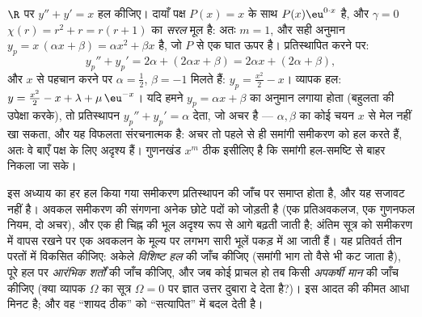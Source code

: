 \begin{example}[बहुलता का नियम काम पर]\label{ex:b1:diffeq:multiplicity}
$\R$ पर $y'' + y' = x$ हल कीजिए। दायाँ पक्ष $P(x) = x$ के साथ $P(x)\eu^{0
\cdot x}$ है, और $\gamma = 0$ $\chi(r) = r^2 + r = r(r + 1)$ का \emph{सरल}
मूल है: अतः $m = 1$, और सही अनुमान $y_p = x\,(\alpha x + \beta) = \alpha x^2
+ \beta x$ है, जो $P$ से एक घात ऊपर है। प्रतिस्थापित करने पर:
\[
y_p'' + y_p' = 2\alpha + (2\alpha x + \beta)
= 2\alpha x + (2\alpha + \beta) ,
\]
और $x$ से पहचान करने पर $\alpha = \frac12$, $\beta = -1$ मिलते हैं: $y_p =
\frac{x^2}2 - x$। व्यापक हल: $y = \frac{x^2}2 - x + \lambda +
\mu\,\eu^{-x}$। यदि हमने $y_p = \alpha x + \beta$ का अनुमान लगाया होता
(बहुलता की उपेक्षा करके), तो प्रतिस्थापन $y_p'' + y_p' = \alpha$ देता, जो
अचर है --- $\alpha, \beta$ का कोई चयन $x$ से मेल नहीं खा सकता, और यह विफलता
संरचनात्मक है: अचर तो पहले से ही समांगी समीकरण को हल करते हैं, अतः वे बाएँ
पक्ष के लिए अदृश्य हैं। गुणनखंड $x^m$ ठीक इसीलिए है कि समांगी हल-समष्टि से
बाहर निकला जा सके।
\end{example}

\begin{remark}[तीस सेकंड की बीमा-पॉलिसी]\label{rem:b1:diffeq:check}
इस अध्याय का हर हल किया गया समीकरण प्रतिस्थापन की जाँच पर समाप्त होता है, और
यह सजावट नहीं है। अवकल समीकरण की संगणना अनेक छोटे पदों को जोड़ती है (एक
प्रतिअवकलज, एक गुणनफल नियम, दो अचर), और एक ही चिह्न की भूल अदृश्य रूप से आगे
बढ़ती जाती है; अंतिम सूत्र को समीकरण में वापस रखने पर एक अवकलन के मूल्य पर
लगभग सारी भूलें पकड़ में आ जाती हैं। यह प्रतिवर्त तीन परतों में विकसित
कीजिए: अकेले \emph{विशिष्ट हल} की जाँच कीजिए (समांगी भाग तो वैसे भी कट जाता
है), पूरे हल पर \emph{आरंभिक शर्तों} की जाँच कीजिए, और जब कोई प्राचल हो तब
किसी \emph{अपकर्षी मान} की जाँच कीजिए (क्या व्यापक $\Omega$ का सूत्र $\Omega
= 0$ पर ज्ञात उत्तर दुबारा दे देता है?)। इस आदत की कीमत आधा मिनट है; और वह
``शायद ठीक'' को ``सत्यापित'' में बदल देती है।
\end{remark}

